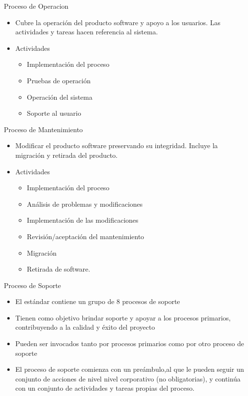 \documentclass{beamer}
\begin{document}
			\begin{frame}{Proceso de Operacion}
			\begin{itemize}
			\item Cubre la operación del producto software y apoyo a los usuarios. Las actividades y tareas hacen referencia al sistema.
			\item Actividades
			
			\begin{itemize}
			\item Implementación del proceso
			\item Pruebas de operación
			\item Operación del sistema
			\item Soporte al usuario 
			\end{itemize}

			\end{itemize}
			\end{frame}
			
			\begin{frame}{Proceso de Mantenimiento}
			
			\begin{itemize}
			\item Modificar el producto software preservando su integridad. Incluye la migración y retirada del producto.
			\item Actividades
			
			\begin{itemize}
			\item Implementación del proceso
			\item Análisis de problemas y modificaciones
			\item Implementación de las modificaciones
			\item Revisión/aceptación del mantenimiento
			\item Migración
			\item Retirada de software.
			\end{itemize}

			\end{itemize}
			
			\end{frame}
			
			\begin{frame}{Proceso de Soporte}
			\begin{itemize}
			\item El estándar contiene un grupo de 8 procesos de soporte
			\item Tienen como objetivo brindar soporte y apoyar a los procesos primarios, contribuyendo a la calidad y éxito del proyecto
			\item Pueden ser invocados tanto por procesos primarios como por otro proceso de soporte
			\item El proceso de soporte comienza con un preámbulo,al que le pueden seguir un conjunto de acciones de nivel nivel corporativo (no obligatorias), y continúa con un conjunto de actividades y tareas propias del proceso.
			\end{itemize}
			\end{frame}
			
\end{document}
